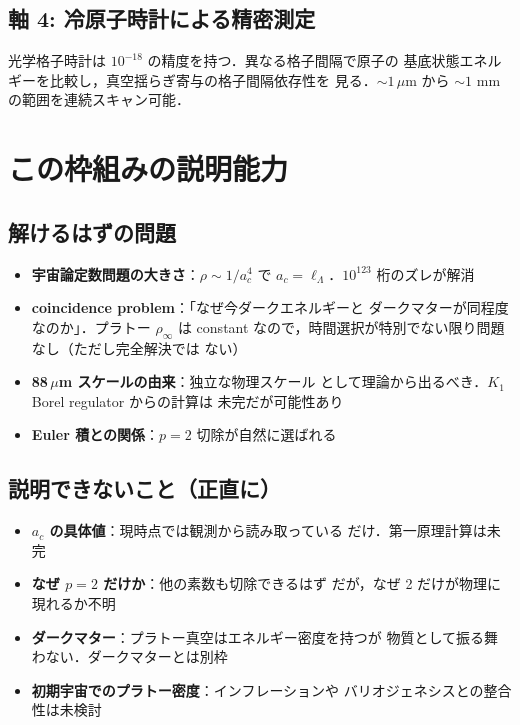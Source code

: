 \documentclass[11pt,a4paper]{article}
\begin{document}
\subsection{軸 4: 冷原子時計による精密測定}

光学格子時計は $10^{-18}$ の精度を持つ．異なる格子間隔で原子の
基底状態エネルギーを比較し，真空揺らぎ寄与の格子間隔依存性を
見る．$\sim 1\,\mu$m から $\sim 1$ mm の範囲を連続スキャン可能．

\section{この枠組みの説明能力}

\subsection{解けるはずの問題}

\begin{itemize}
\item \textbf{宇宙論定数問題の大きさ}：$\rho \sim 1/a_c^4$ で
$a_c = \ell_\Lambda$．$10^{123}$ 桁のズレが解消
\item \textbf{coincidence problem}：「なぜ今ダークエネルギーと
ダークマターが同程度なのか」．プラトー $\rho_\infty$ は constant
なので，時間選択が特別でない限り問題なし（ただし完全解決では
ない）
\item \textbf{88\,$\mu$m スケールの由来}：独立な物理スケール
として理論から出るべき．$K_1$ Borel regulator からの計算は
未完だが可能性あり
\item \textbf{Euler 積との関係}：$p=2$ 切除が自然に選ばれる
\end{itemize}

\subsection{説明できないこと（正直に）}

\begin{itemize}
\item \textbf{$a_c$ の具体値}：現時点では観測から読み取っている
だけ．第一原理計算は未完
\item \textbf{なぜ $p=2$ だけか}：他の素数も切除できるはず
だが，なぜ 2 だけが物理に現れるか不明
\item \textbf{ダークマター}：プラトー真空はエネルギー密度を持つが
物質として振る舞わない．ダークマターとは別枠
\item \textbf{初期宇宙でのプラトー密度}：インフレーションや
バリオジェネシスとの整合性は未検討
\end{itemize}
\end{document}
